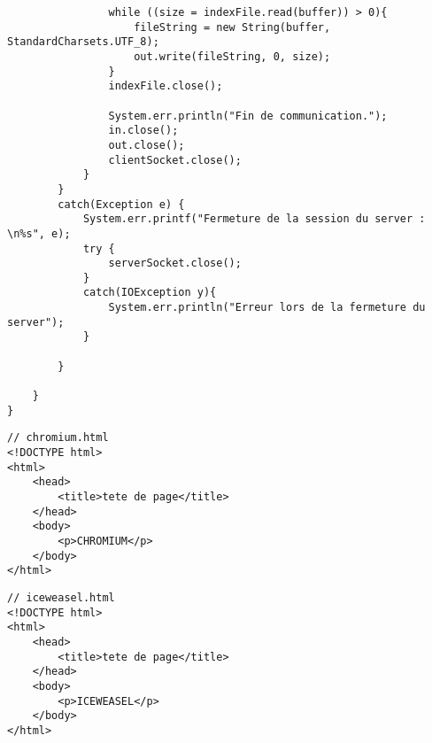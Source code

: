 \documentclass{article}
\begin{document}
\begin{lstlisting}
                while ((size = indexFile.read(buffer)) > 0){
                    fileString = new String(buffer, StandardCharsets.UTF_8);
                    out.write(fileString, 0, size);
                }
                indexFile.close();
                
                System.err.println("Fin de communication.");
                in.close();
                out.close();
                clientSocket.close();
            }
        }
        catch(Exception e) {
            System.err.printf("Fermeture de la session du server : \n%s", e);
            try {
                serverSocket.close();
            }
            catch(IOException y){
                System.err.println("Erreur lors de la fermeture du server");
            }
            
        }
        
    }
}
\end{lstlisting}
\begin{lstlisting}
// chromium.html
<!DOCTYPE html>
<html>
    <head>
        <title>tete de page</title>
    </head>
    <body>
        <p>CHROMIUM</p>
    </body>
</html>
\end{lstlisting}
\begin{lstlisting}
// iceweasel.html
<!DOCTYPE html>
<html>
    <head>
        <title>tete de page</title>
    </head>
    <body>
        <p>ICEWEASEL</p>
    </body>
</html>
\end{lstlisting}
\end{document}
